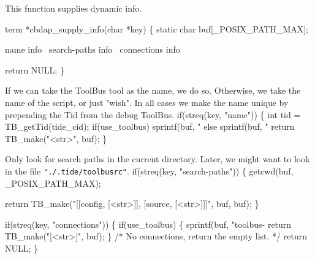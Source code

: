 
This function supplies dynamic info.

\nwenddocs{}\endmoddef\let\nwnotused=\nwoutput{}
term *cbdap_supply_info(char *key)
\{
  static char buf[_POSIX_PATH_MAX];

  \LA{}name info~{\nwtagstyle{}}\RA{}
  \LA{}search-paths info~{\nwtagstyle{}}\RA{}
  \LA{}connections info~{\nwtagstyle{}}\RA{}

  return NULL;
\}
\nwendcode{}\nwdocspar

If we can take the ToolBus tool as the name, we do so.
Otherwise, we take the name of the script, or just "wish".
In all cases we make the name unique by prepending the
Tid from the debug ToolBus.
\nwenddocs{}\endmoddef
  if(streq(key, "name")) \{
    int tid = TB_getTid(tide_cid);
    if(use_toolbus)
      sprintf(buf, "%
    else
      sprintf(buf, "%
    return TB_make("<str>", buf);
  \}
\nwendcode{}\nwdocspar

Only look for search paths in the current directory. Later, we
might want to look in the file {\tt "./.tide/toolbusrc"}.
\nwenddocs{}\endmoddef
  if(streq(key, "search-paths")) \{
    getcwd(buf, _POSIX_PATH_MAX);

    return TB_make("[[config, [<str>]], [source, [<str>]]]", buf, buf);
  \}
\nwendcode{}\nwdocspar

\nwenddocs{}\endmoddef
  if(streq(key, "connections")) \{
    if(use_toolbus) \{
      sprintf(buf, "toolbus-%
      return TB_make("[<str>]", buf);
    \}
    /* No connections, return the empty list. */
    return NULL;
  \}
\nwendcode{}\nwdocspar

